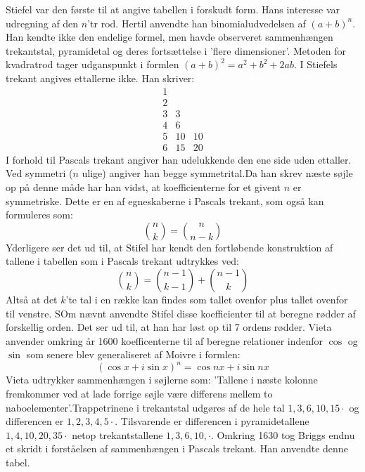 Stiefel var den første til at angive tabellen i forskudt form. Hans interesse var udregning af den \(n\)'tr rod. Hertil anvendte han binomialudvedelsen af \((a+b)^{n}\). Han kendte ikke den endelige formel, men havde observeret sammenhængen trekantstal, pyramidetal og deres fortsættelse i 'flere dimensioner'. Metoden for kvadratrod tager udganspunkt i formlen \((a+b)^{2}=a^{2}+b^{2}+2ab\). I Stiefels trekant angives ettallerne ikke. Han skriver:
\begin{equation}
\begin{array}{rrr}
1\\
2\\
3&3\\
4&6\\
5&10&10\\
6&15&20
\end{array}
\end{equation}
I forhold til Pascals trekant angiver han udelukkende den ene side uden ettaller. Ved symmetri (\(n\) ulige) angiver han begge symmetrital.Da han skrev næste søjle op på denne måde har han vidst, at koefficienterne for et givent \(n\) er symmetriske. Dette er en af egneskaberne i Pascals trekant, som også kan formuleres som:
\begin{equation}
\binom{n}{k}=\binom{n}{n-k}
\end{equation}
Yderligere ser det ud til, at Stifel har kendt den fortløbende konstruktion af tallene i tabellen som i Pascals trekant udtrykkes ved:
\begin{equation}
\binom{n}{k}=\binom{n-1}{k-1}+\binom{n-1}{k}
\end{equation}
Altså at det \(k\)'te tal i en række kan findes som tallet ovenfor plus tallet ovenfor til venstre. SOm nævnt anvendte Stifel disse koefficienter til at beregne rødder af forskellig orden. Det ser ud til, at han har løst op til 7 ordens rødder. Vieta anvender omkring år 1600 koefficenterne til af beregne relationer indenfor \(\cos\) og \(\sin\) som senere blev generaliseret af Moivre i formlen:
\[(\cos{x}+i\sin{x})^{n}=\cos{nx}+i\sin{nx}\]
Vieta udtrykker sammenhængen i søjlerne som: 'Tallene i næste kolonne fremkommer ved at lade forrige søjle være differens mellem to naboelementer'.Trappetrinene i trekantstal udgøres af de hele tal 
\(1,3,6,10,15 \cdot\) og differencen er \(1,2,3,4,5 \cdot \). Tilsvarende er differencen i pyramidetallene \(1,4,10,20,35 \cdot\) netop trekantstallene \(1,3,6,10, \cdot\). Omkring 1630 tog Briggs endnu et skridt i forståelsen af sammenhængen i Pascals trekant. Han anvendte denne tabel.
